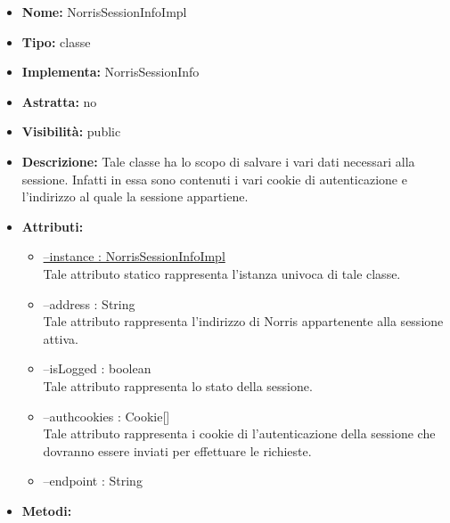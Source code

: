 			
			\begin{itemize}
			\item \textbf{Nome:} NorrisSessionInfoImpl
			\item \textbf{Tipo:} classe
			
		\item \textbf{Implementa:}
		NorrisSessionInfo
		\item \textbf{Astratta:}
		no
			\item \textbf{Visibilità:} public
			\item \textbf{Descrizione:} Tale classe ha lo scopo di salvare i vari dati necessari alla sessione. Infatti in essa sono contenuti i vari cookie di autenticazione e l'indirizzo al quale la sessione appartiene.
			\item \textbf{Attributi:}
				\begin{itemize}
				\setlength{\itemsep}{5pt}
				
					\item[\ding{111}] \underline{--instance : NorrisSessionInfoImpl} \\ [1mm] Tale attributo statico rappresenta l'istanza univoca di tale classe.
					\item[\ding{111}] {--address : String} \\ [1mm] Tale attributo rappresenta l'indirizzo di Norris appartenente alla sessione attiva.
					\item[\ding{111}] {--isLogged : boolean} \\ [1mm] Tale attributo rappresenta lo stato della sessione.
					\item[\ding{111}] {--authcookies : Cookie[]} \\ [1mm] Tale attributo rappresenta i cookie di l'autenticazione della sessione che dovranno essere inviati per effettuare le richieste.
					\item[\ding{111}] {--endpoint : String}
				\end{itemize}
		
			\item \textbf{Metodi:}
				\begin{itemize}
				\setlength{\itemsep}{5pt}
				

\end{itemize}
\end{itemize}
